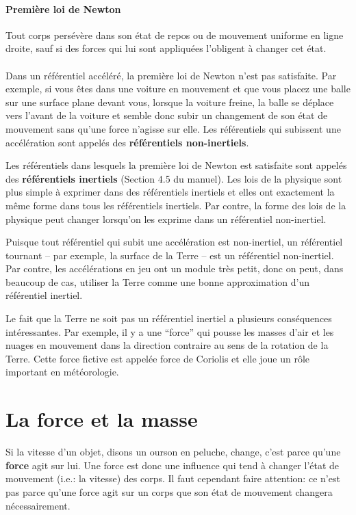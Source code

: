 \paragraph{Première loi de Newton}
Tout corps persévère dans son état de repos ou de mouvement uniforme en ligne
droite, sauf si des forces qui lui sont appliquées l'obligent à changer cet
état.

\paragraph{}
Dans un référentiel accéléré, la première loi de Newton n'est pas satisfaite.
Par exemple, si vous êtes dans une voiture en mouvement et que vous placez une
balle sur une surface plane devant vous, lorsque la voiture freine, la balle se
déplace vers l'avant de la voiture et semble donc subir un changement de son
état de mouvement sans qu'une force n'agisse sur elle.  Les référentiels qui
subissent une accélération sont appelés des \textbf{référentiels non-inertiels}.

Les référentiels dans lesquels la première loi de Newton est satisfaite sont
appelés des \textbf{référentiels inertiels} (Section 4.5 du manuel).  Les lois
de la physique sont plus simple à exprimer dans des référentiels inertiels et
elles ont exactement la même forme dans tous les référentiels inertiels.  Par
contre, la forme des lois de la physique peut changer lorsqu'on les exprime
dans un référentiel non-inertiel.

Puisque tout référentiel qui subit une accélération est non-inertiel, un
référentiel tournant -- par exemple, la surface de la Terre -- est un
référentiel non-inertiel.  Par contre, les accélérations en jeu ont un module
très petit, donc on peut, dans beaucoup de cas, utiliser la Terre comme une
bonne approximation d'un référentiel inertiel.

Le fait que la Terre ne soit pas un référentiel inertiel a plusieurs
conséquences intéressantes.  Par exemple, il y a une ``force'' qui pousse les
masses d'air et les nuages en mouvement dans la direction contraire au sens de
la rotation de la Terre.  Cette force fictive est appelée force de Coriolis et
elle joue un rôle important en météorologie.


\section{La force et la masse}

Si la vitesse d'un objet, disons un ourson en peluche, change, c'est parce
qu'une \textbf{force} agit sur lui.  Une force est donc une influence qui tend
à changer l'état de mouvement (i.e.: la vitesse) des corps.  Il faut cependant
faire attention: ce n'est pas parce qu'une force agit sur un corps que son
état de mouvement changera nécessairement.

